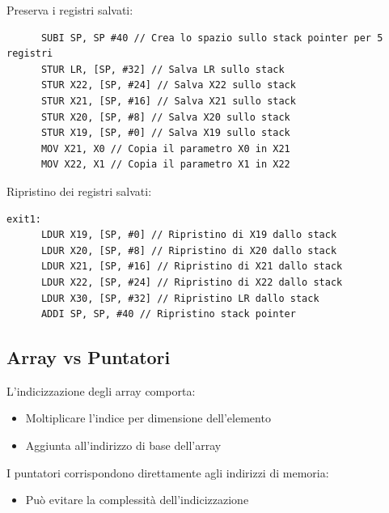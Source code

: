 \documentclass[12pt,a4paper]{article}
\begin{document}
\Sep \noindent
Preserva i registri salvati:
\begin{verbatim}
      SUBI SP, SP #40 // Crea lo spazio sullo stack pointer per 5 registri
      STUR LR, [SP, #32] // Salva LR sullo stack
      STUR X22, [SP, #24] // Salva X22 sullo stack
      STUR X21, [SP, #16] // Salva X21 sullo stack
      STUR X20, [SP, #8] // Salva X20 sullo stack
      STUR X19, [SP, #0] // Salva X19 sullo stack
      MOV X21, X0 // Copia il parametro X0 in X21
      MOV X22, X1 // Copia il parametro X1 in X22
\end{verbatim}

\Sep \noindent
Ripristino dei registri salvati:
\begin{verbatim}
exit1:
      LDUR X19, [SP, #0] // Ripristino di X19 dallo stack
      LDUR X20, [SP, #8] // Ripristino di X20 dallo stack
      LDUR X21, [SP, #16] // Ripristino di X21 dallo stack
      LDUR X22, [SP, #24] // Ripristino di X22 dallo stack
      LDUR X30, [SP, #32] // Ripristino LR dallo stack
      ADDI SP, SP, #40 // Ripristino stack pointer
\end{verbatim}

\subsection{Array vs Puntatori}
L'indicizzazione degli array comporta:
\begin{itemize}
\item Moltiplicare l'indice per dimensione dell'elemento
\item Aggiunta all'indirizzo di base dell'array
\end{itemize}
I puntatori corrispondono direttamente agli indirizzi di memoria:
\begin{itemize}
\item Può evitare la complessità dell'indicizzazione
\end{itemize}
\end{document}
